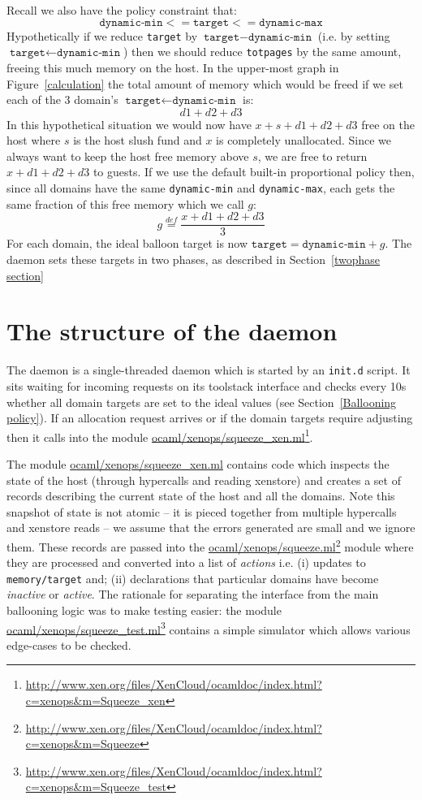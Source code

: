 \documentclass{article}
\newcommand{\eqdef}{\stackrel{def}{=}}
\begin{document}
 Recall we also have the policy constraint that:
\[
\texttt{dynamic-min} <= \texttt{target} <= \texttt{dynamic-max}
\]
Hypothetically if we reduce \texttt{target} by $\texttt{target}-\texttt{dynamic-min}$ (i.e. by setting $\texttt{target}\leftarrow\texttt{dynamic-min}$) then we should reduce \texttt{totpages} by the same amount, freeing this much memory on the host. In the upper-most graph in Figure~\ref{calculation} the total amount of memory which would be freed if we set each of the 3 domain's $\texttt{target}\leftarrow\texttt{dynamic-min}$ is:
\[
\mathit{d1} + \mathit{d2} + \mathit{d3}
\]
In this hypothetical situation we would now have $x + s + \mathit{d1} + \mathit{d2} + \mathit{d3}$ free on the host where $s$ is the host slush fund and $x$ is completely unallocated. Since we always want to keep the host free memory above $s$, we are free to return $x + \mathit{d1} + \mathit{d2} + \mathit{d3}$ to guests. If we use the default built-in proportional policy then, since all domains have the same \texttt{dynamic-min} and \texttt{dynamic-max}, each gets the same fraction of this free memory which we call $g$:
\[
g \eqdef \frac{x + \mathit{d1} + \mathit{d2} + \mathit{d3}}{3}
\]
For each domain, the ideal balloon target is now $\texttt{target} = \texttt{dynamic-min} + g$. The \squeezed{} daemon sets these targets in two phases, as described in Section~\ref{twophase section}

\section{The structure of the daemon}
\label{structure}
The \squeezed{} daemon is a single-threaded daemon which is started by an \texttt{init.d} script. It sits waiting for incoming requests on its toolstack interface and checks every 10s whether all domain targets are set to the ideal values (see Section~\ref{Ballooning policy}). If an allocation request arrives or if the domain targets require adjusting then it calls into the module \url{ocaml/xenops/squeeze_xen.ml}\footnote{\url{http://www.xen.org/files/XenCloud/ocamldoc/index.html?c=xenops&m=Squeeze_xen}}.

The module \url{ocaml/xenops/squeeze_xen.ml} contains code which inspects the state of the host (through hypercalls and reading xenstore) and creates a set of records describing the current state of the host and all the domains. Note this snapshot of state is not atomic -- it is pieced together from multiple hypercalls and xenstore reads -- we assume that the errors generated are small and we ignore them.
 These records are passed into the \url{ocaml/xenops/squeeze.ml}\footnote{\url{http://www.xen.org/files/XenCloud/ocamldoc/index.html?c=xenops&m=Squeeze}} module where they are processed and converted into a list of {\em actions} i.e. (i) updates to \texttt{memory/target} and; (ii) declarations that particular domains have become {\em inactive} or {\em active}. The rationale for separating the \xen{} interface from the main ballooning logic was to make testing easier: the module \url{ocaml/xenops/squeeze_test.ml}\footnote{\url{http://www.xen.org/files/XenCloud/ocamldoc/index.html?c=xenops&m=Squeeze_test}} contains a simple simulator which allows various edge-cases to be checked.
\end{document}
